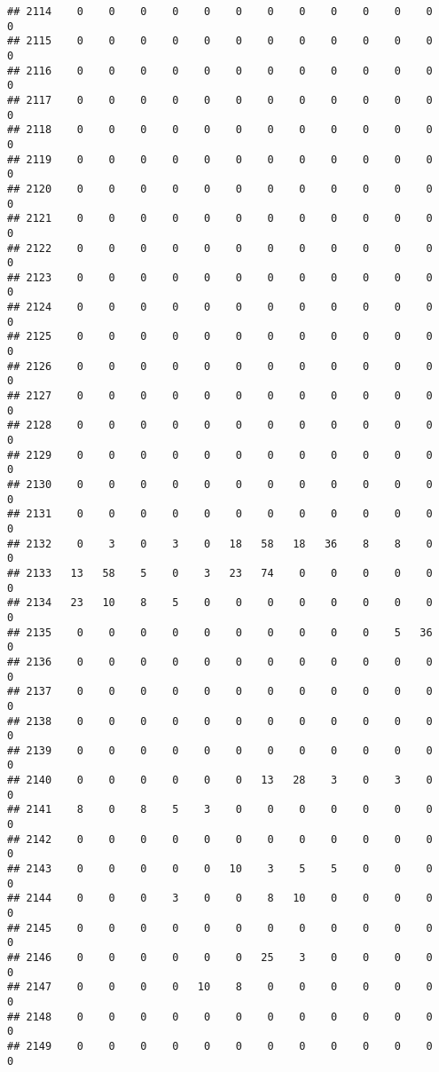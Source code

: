 \documentclass[]{article}
\begin{document}
\begin{verbatim}
## 2114    0    0    0    0    0    0    0    0    0    0    0    0    0
## 2115    0    0    0    0    0    0    0    0    0    0    0    0    0
## 2116    0    0    0    0    0    0    0    0    0    0    0    0    0
## 2117    0    0    0    0    0    0    0    0    0    0    0    0    0
## 2118    0    0    0    0    0    0    0    0    0    0    0    0    0
## 2119    0    0    0    0    0    0    0    0    0    0    0    0    0
## 2120    0    0    0    0    0    0    0    0    0    0    0    0    0
## 2121    0    0    0    0    0    0    0    0    0    0    0    0    0
## 2122    0    0    0    0    0    0    0    0    0    0    0    0    0
## 2123    0    0    0    0    0    0    0    0    0    0    0    0    0
## 2124    0    0    0    0    0    0    0    0    0    0    0    0    0
## 2125    0    0    0    0    0    0    0    0    0    0    0    0    0
## 2126    0    0    0    0    0    0    0    0    0    0    0    0    0
## 2127    0    0    0    0    0    0    0    0    0    0    0    0    0
## 2128    0    0    0    0    0    0    0    0    0    0    0    0    0
## 2129    0    0    0    0    0    0    0    0    0    0    0    0    0
## 2130    0    0    0    0    0    0    0    0    0    0    0    0    0
## 2131    0    0    0    0    0    0    0    0    0    0    0    0    0
## 2132    0    3    0    3    0   18   58   18   36    8    8    0    0
## 2133   13   58    5    0    3   23   74    0    0    0    0    0    0
## 2134   23   10    8    5    0    0    0    0    0    0    0    0    0
## 2135    0    0    0    0    0    0    0    0    0    0    5   36    0
## 2136    0    0    0    0    0    0    0    0    0    0    0    0    0
## 2137    0    0    0    0    0    0    0    0    0    0    0    0    0
## 2138    0    0    0    0    0    0    0    0    0    0    0    0    0
## 2139    0    0    0    0    0    0    0    0    0    0    0    0    0
## 2140    0    0    0    0    0    0   13   28    3    0    3    0    0
## 2141    8    0    8    5    3    0    0    0    0    0    0    0    0
## 2142    0    0    0    0    0    0    0    0    0    0    0    0    0
## 2143    0    0    0    0    0   10    3    5    5    0    0    0    0
## 2144    0    0    0    3    0    0    8   10    0    0    0    0    0
## 2145    0    0    0    0    0    0    0    0    0    0    0    0    0
## 2146    0    0    0    0    0    0   25    3    0    0    0    0    0
## 2147    0    0    0    0   10    8    0    0    0    0    0    0    0
## 2148    0    0    0    0    0    0    0    0    0    0    0    0    0
## 2149    0    0    0    0    0    0    0    0    0    0    0    0    0

\end{verbatim}
\end{document}
